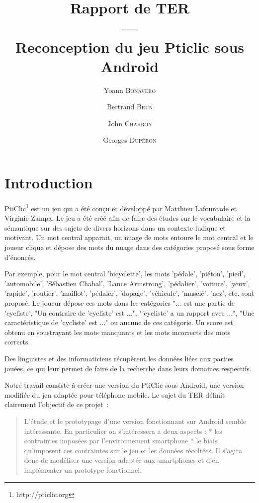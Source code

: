 \documentclass[a4paper,11pt,french]{article}
\title{Rapport de TER\\---\\Reconception du jeu Pticlic sous Android}
\author{Yoann \textsc{Bonavero} \and Bertrand \textsc{Brun} \and John \textsc{Charron} \and Georges \textsc{Dupéron}}
\begin{document}
\maketitle


\pagestyle{empty}
\thispagestyle{empty}

\tableofcontents


\pagestyle{empty}
\thispagestyle{empty}
\newpage
\setcounter{page}{1}
\pagestyle{plain}


\section{Introduction}

PtiClic\footnote{http://pticlic.org} est un jeu qui a été conçu et développé par Matthieu Lafourcade et Virginie Zampa. Le jeu a été créé afin de faire des études sur le vocabulaire et la sémantique sur des sujets de divers horizons dans un contexte ludique et motivant. Un mot central apparait, un nuage de mots entoure le mot central et le joueur clique et dépose des mots du nuage dans des catégories proposé sous forme d'énoncés. 

Par exemple, pour le mot central 'bicyclette', les mots 'pédale', 'piéton', 'pied', 'automobile', 'Sébastien Chabal', 'Lance Armstrong', 'pédalier', 'voiture', 'yeux', 'rapide', 'routier', 'maillot', 'pédaler', 'dopage', 'véhicule', 'musclé', 'nez', etc. sont proposé. Le joueur dépose ces mots dans les catégories "... est une partie de 'cycliste', "Un contraire de 'cycliste' est ...", "'cycliste' a un rapport avec ...",  "Une caractéristique de 'cycliste' est ..." ou aucune de ces catégorie. Un score est obtenu en soustrayant les mots manquants et les mots incorrects des mots corrects. 

Des linguistes et des informaticiens récupèrent les données liées aux parties jouées, ce qui leur permet de faire de la recherche dans leurs domaines respectifs.

Notre travail consiste à créer une version du PtiClic sous Android, une version modifiée du jeu adaptée pour téléphone mobile. Le sujet du TER définit clairement l'objectif de ce projet~:

\begin{quotation}
L'étude et le prototypage d'une version fonctionnant sur Android semble intéressante. En particulier on s'intéressera a deux aspects : * les contraintes imposées par l'environnement smartphone * le biais qu'imposent ces contraintes sur le jeu et les données récoltées. Il s'agira donc de modéliser une version adaptée aux smartphones et d'en implémenter un prototype fonctionnel. 
\end{quotation}
\end{document}
